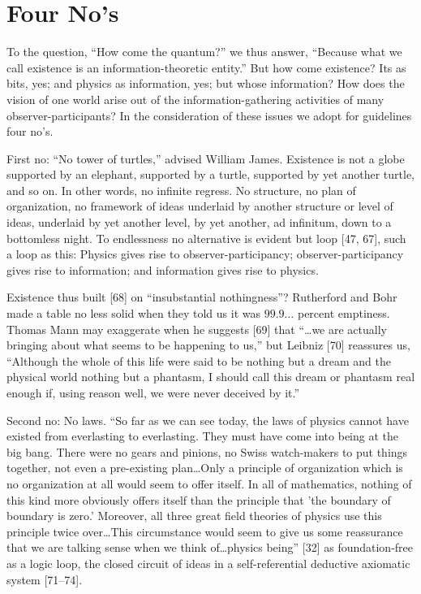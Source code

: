 \documentclass[11pt]{article}
\begin{document}
	\section{Four No's}
	To the question, ``How come the quantum?'' we thus answer, ``Because what we
	call existence is an information-theoretic entity.'' But how come existence? Its
	as bits, yes; and physics as information, yes; but whose information? How does
	the vision of one world arise out of the information-gathering activities of many
	observer-participants? In the consideration of these issues we adopt for guidelines
	four no's.
	
	First no: ``No tower of turtles,'' advised William James. Existence is not a globe
	supported by an elephant, supported by a turtle, supported by yet another turtle,
	and so on. In other words, no infinite regress. No structure, no plan of organization,
	no framework of ideas underlaid by another structure or level of ideas, underlaid
	by yet another level, by yet another, ad infinitum, down to a bottomless night. To
	endlessness no alternative is evident but loop [47, 67], such a loop as this: Physics
	gives rise to observer-participancy; observer-participancy gives rise to information;
	and information gives rise to physics.
	
	Existence thus built [68] on ``insubstantial nothingness''? Rutherford and Bohr
	made a table no less solid when they told us it was $99.9\ldots$ percent emptiness.
	Thomas Mann may exaggerate when he suggests [69] that ``\ldots we are actually
	bringing about what seems to be happening to us,'' but Leibniz [70] reassures us,
	``Although the whole of this life were said to be nothing but a dream and the physical
	world nothing but a phantasm, I should call this dream or phantasm real enough
	if, using reason well, we were never deceived by it.''
	
	Second no: No laws. ``So far as we can see today, the laws of physics cannot
	have existed from everlasting to everlasting. They must have come into being at
	the big bang. There were no gears and pinions, no Swiss watch-makers to put
	things together, not even a pre-existing plan\ldots Only a principle of organization
	which is no organization at all would seem to offer itself. In all of mathematics,
	nothing of this kind more obviously offers itself than the principle that 'the boundary
	of boundary is zero.' Moreover, all three great field theories of physics use this
	principle twice over\ldots This circumstance would seem to give us some reassurance
	that we are talking sense when we think of\ldots physics being'' [32] as foundation-free
	as a logic loop, the closed circuit of ideas in a self-referential deductive axiomatic
	system [71--74].
	
\end{document}
